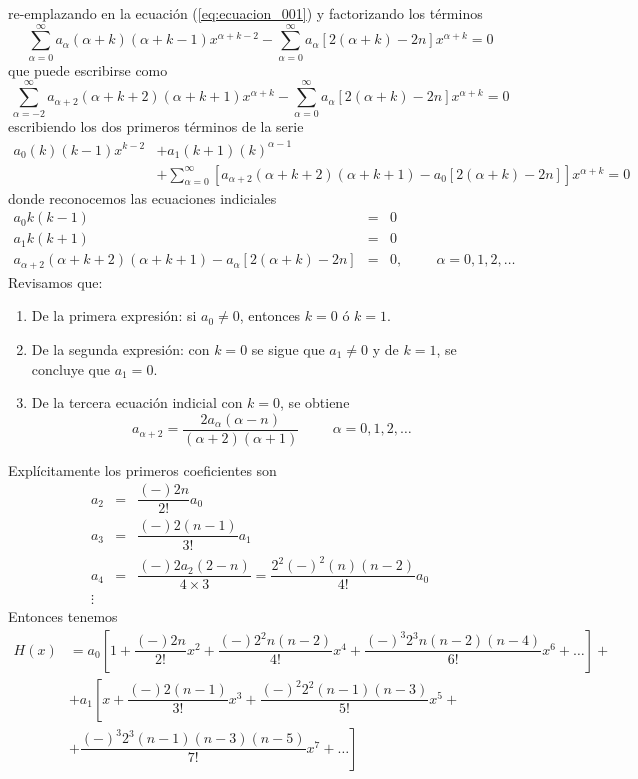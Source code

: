 re-emplazando en la ecuación (\ref{eq:ecuacion_001}) y factorizando los términos
\[ \sum_{\alpha = 0}^{\infty} a_{\alpha}(\alpha + k)(\alpha + k - 1) x^{\alpha + k-2} - \sum_{\alpha=0}^{\infty} a_{\alpha} [ 2 (\alpha + k) - 2n ] x^{\alpha +k} = 0 \]
que puede escribirse como
\[ \sum_{\alpha=-2}^{\infty} a_{\alpha + 2}( \alpha + k + 2)(\alpha + k + 1) x^{\alpha + k} - \sum_{\alpha=0}^{\infty} a_{\alpha} [2 (\alpha + k) - 2n ] x^{\alpha + k} = 0 \]
escribiendo los dos primeros términos de la serie
\[ \begin{split}
 a_{0}(k)(k - 1) x^{k-2} &+ a_{1} (k + 1)(k)^{\alpha-1} \\
&+ \sum_{\alpha=0}^{\infty} \left[ a_{\alpha + 2} (\alpha + k +2)(\alpha + k + 1) - a_{0} [2 (\alpha + k ) - 2n] \right] x^{\alpha + k} = 0 
\end{split} \]
donde reconocemos las ecuaciones indiciales
\begin{eqnarray}
a_{0} k (k-1) &=& 0 \nonumber \\
a_{1} k (k+1) &=& 0 \nonumber \\
a_{\alpha+2} (\alpha + k + 2) (\alpha + k + 1) - a_{\alpha} [2 (\alpha + k) - 2n] &=& 0, \hspace{1cm} \alpha=0,1,2,\ldots \nonumber
\end{eqnarray}
Revisamos que:
\begin{enumerate}
\item De la primera expresión: si $a_{0} \neq 0$, entonces $k=0$ ó $k=1$.
\item De la segunda expresión: con $k=0$ se sigue que $a_{1} \neq 0$ y de $k=1$, se concluye que $a_{1} = 0$.
\item De la tercera ecuación indicial con $k=0$, se obtiene
\[ a_{\alpha+2} = \dfrac{2a_{\alpha}(\alpha - n)}{(\alpha + 2)(\alpha + 1)} \hspace{1cm} \alpha = 0, 1, 2, \ldots \]
\end{enumerate}
Explícitamente los primeros coeficientes son
\begin{eqnarray}
a_{2} &=& \dfrac{(-) 2n}{2!} a_{0} \nonumber \\
a_{3} &=& \dfrac{(-) 2(n-1)}{3!} a_{1} \nonumber \\
a_{4} &=& \dfrac{(-) 2 a_{2} (2 - n)}{4 \times 3} = \dfrac{2^{2} (-)^{2}(n)(n - 2)}{4!} a_{0} \nonumber \\
\vdots \nonumber
\end{eqnarray}
Entonces tenemos
\[ \begin{split}
H(x) &= a_{0} \left[ 1 + \dfrac{(-) 2n}{2!} x^{2} + \dfrac{(-) 2^{2} n (n - 2)}{4!} x^{4} + \dfrac{(-)^{3}2^{3} n (n-2)(n-4) }{6!} x^{6} + \ldots \right] + \\
&+ a_{1} \left[ x + \dfrac{(-) 2 (n-1)}{3!} x^{3} + \dfrac{(-)^{2}2^{2}(n-1)(n-3)}{5!} x^{5} + \right.\\
&+ \left. \dfrac{(-)^{3}2^{3}(n-1)(n-3)(n-5)}{7!} x^{7} + \ldots \right]
\end{split} \]
